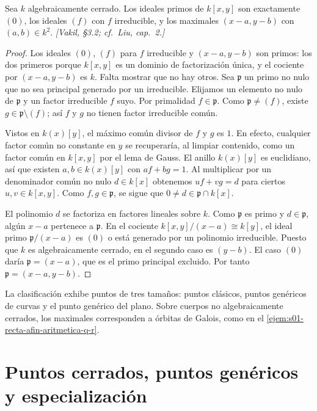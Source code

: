 \begin{teo}
\label{teo:s01-plano-afin}
Sea $k$ algebraicamente cerrado. Los ideales primos de $k[x,y]$ son exactamente $(0)$, los ideales $(f)$ con $f$ irreducible, y los maximales $(x-a,y-b)$ con $(a,b)\in k^2$. \emph{[Vakil, \S3.2; cf.~Liu, cap.~2.]}
\end{teo}
\begin{proof}
Los ideales $(0)$, $(f)$ para $f$ irreducible y $(x-a,y-b)$ son primos: los dos primeros porque $k[x,y]$ es un dominio de factorización única, y el cociente por $(x-a,y-b)$ es $k$. Falta mostrar que no hay otros. Sea $\mathfrak p$ un primo no nulo que no sea principal generado por un irreducible. Elijamos un elemento no nulo de $\mathfrak p$ y un factor irreducible $f$ suyo. Por primalidad $f\in\mathfrak p$. Como $\mathfrak p\ne(f)$, existe $g\in\mathfrak p\setminus(f)$; así $f$ y $g$ no tienen factor irreducible común.

Vistos en $k(x)[y]$, el máximo común divisor de $f$ y $g$ es $1$. En efecto, cualquier factor común no constante en $y$ se recuperaría, al limpiar contenido, como un factor común en $k[x,y]$ por el lema de Gauss. El anillo $k(x)[y]$ es euclidiano, así que existen $a,b\in k(x)[y]$ con $af+bg=1$. Al multiplicar por un denominador común no nulo $d\in k[x]$ obtenemos $uf+vg=d$ para ciertos $u,v\in k[x,y]$. Como $f,g\in\mathfrak p$, se sigue que $0\ne d\in\mathfrak p\cap k[x]$.

El polinomio $d$ se factoriza en factores lineales sobre $k$. Como $\mathfrak p$ es primo y $d\in\mathfrak p$, algún $x-a$ pertenece a $\mathfrak p$. En el cociente $k[x,y]/(x-a)\cong k[y]$, el ideal primo $\mathfrak p/(x-a)$ es $(0)$ o está generado por un polinomio irreducible. Puesto que $k$ es algebraicamente cerrado, en el segundo caso es $(y-b)$. El caso $(0)$ daría $\mathfrak p=(x-a)$, que es el primo principal excluido. Por tanto $\mathfrak p=(x-a,y-b)$.
\end{proof}
\begin{obs}
\label{obs:s01-jerarquia-plano-afin}
La clasificación exhibe puntos de tres tamaños: puntos clásicos, puntos genéricos de curvas y el punto genérico del plano. Sobre cuerpos no algebraicamente cerrados, los maximales corresponden a órbitas de Galois, como en el \cref{ejem:s01-recta-afin-aritmetica-q-r}.
\end{obs}

\section{Puntos cerrados, puntos genéricos y especialización}


